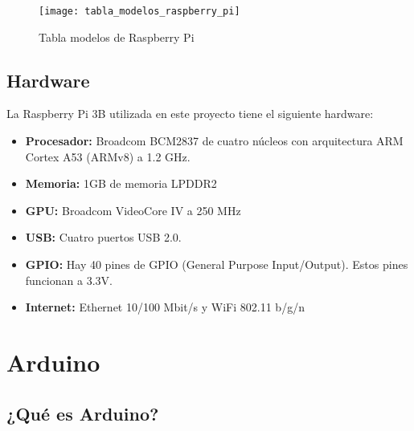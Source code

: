             \begin{figure}[ht]
                \centering
                \texttt{[image: tabla\_modelos\_raspberry\_pi]}
                \caption{Tabla modelos de Raspberry Pi\cite{raspberry_pi_wikipedia_en}\label{fig:ImagenModelosPi}}
            \end{figure}

            \newpage


        \subsection{Hardware} %
        \label{sub:HardwareRaspberryPi}

            La Raspberry Pi 3B utilizada en este proyecto tiene el siguiente hardware\cite{raspberry_pi_hardware}:

            \begin{itemize}
                \item \textbf{Procesador:} Broadcom BCM2837 de cuatro núcleos con arquitectura ARM Cortex A53 (ARMv8) a
                1.2 GHz.
                \item \textbf{Memoria:} 1GB de memoria LPDDR2
                \item \textbf{GPU:} Broadcom VideoCore IV a 250 MHz
                \item \textbf{USB:} Cuatro puertos USB 2.0.
                \item \textbf{GPIO:} Hay 40 pines de GPIO (General Purpose Input/Output). Estos pines funcionan a 3.3V.
                \item \textbf{Internet:} Ethernet 10/100 Mbit/s y WiFi 802.11 b/g/n
            \end{itemize}



    \section{Arduino} %
    \label{sec:Arduino}

        \subsection{¿Qué es Arduino?} %
        \label{sub:QueEsArduino}

